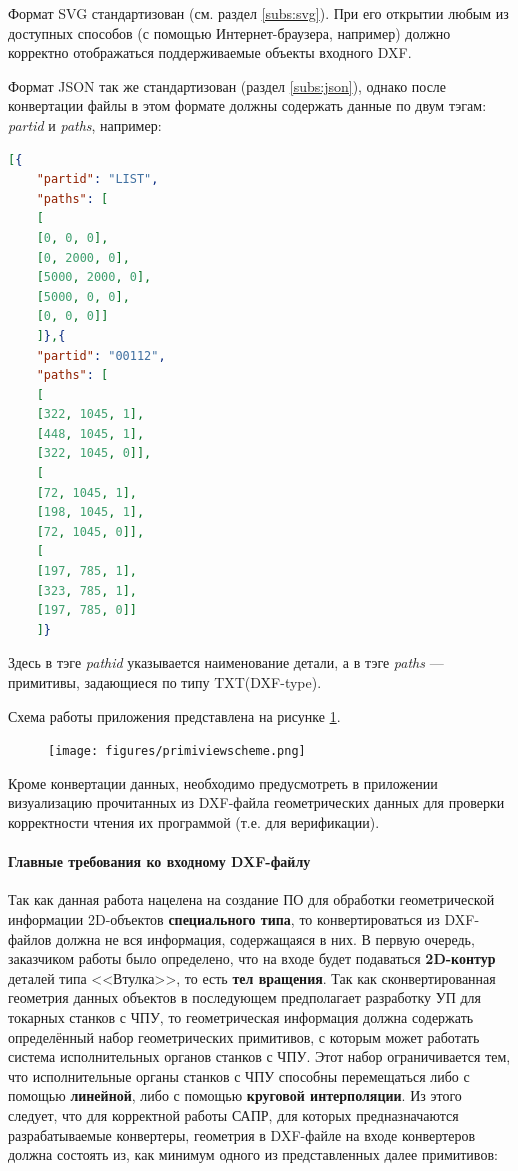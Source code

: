 Формат SVG стандартизован (см. раздел \ref{subs:svg}). При его открытии любым из доступных способов (с помощью Интернет-браузера, например) должно корректно отображаться поддерживаемые объекты входного DXF.

Формат JSON так же стандартизован (раздел \ref{subs:json}), однако после конвертации файлы в этом формате должны содержать данные по двум тэгам: \textit{partid} и \textit{paths}, например:
\begin{lstlisting}[language=json,label=list:dxftxtscheme]
[{
	"partid": "LIST",
	"paths": [
	[
	[0, 0, 0],
	[0, 2000, 0],
	[5000, 2000, 0],
	[5000, 0, 0],
	[0, 0, 0]]
	]},{
	"partid": "00112",
	"paths": [
	[
	[322, 1045, 1],
	[448, 1045, 1],
	[322, 1045, 0]],
	[
	[72, 1045, 1],
	[198, 1045, 1],
	[72, 1045, 0]],
	[
	[197, 785, 1],
	[323, 785, 1],
	[197, 785, 0]]
	]}
\end{lstlisting}

Здесь в тэге \textit{pathid} указывается наименование детали, а в тэге \textit{paths} --- примитивы, задающиеся по типу TXT(DXF-type).

Схема работы приложения представлена на рисунке \ref{fig:primiviewscheme}.

\begin{figure}[H]
	\centering
	\texttt{[image: figures/primiviewscheme.png]}
	\label{fig:primiviewscheme}
\end{figure}

Кроме конвертации данных, необходимо предусмотреть в приложении визуализацию прочитанных из DXF-файла геометрических данных для проверки корректности чтения их программой (т.е. для верификации).

\paragraph{Главные требования ко входному DXF-файлу}

Так как данная работа нацелена на создание ПО для обработки геометрической информации 2D-объектов \textbf{специального типа}, то конвертироваться из DXF-файлов должна не вся информация, содержащаяся в них. В первую очередь, заказчиком работы было определено, что на входе будет подаваться \textbf{2D-контур} деталей типа <<Втулка>>, то есть \textbf{тел вращения}. Так как сконвертированная геометрия данных объектов в последующем предполагает разработку УП для токарных станков с ЧПУ, то геометрическая информация должна содержать определённый набор геометрических примитивов, с которым может работать система исполнительных органов станков с ЧПУ. Этот набор ограничивается тем, что исполнительные органы станков с ЧПУ способны перемещаться либо с помощью \textbf{линейной}, либо с помощью \textbf{круговой интерполяции}. Из этого следует, что для корректной работы САПР, для которых предназначаются разрабатываемые конвертеры, геометрия в DXF-файле на входе конвертеров должна состоять из, как минимум одного из представленных далее примитивов:


